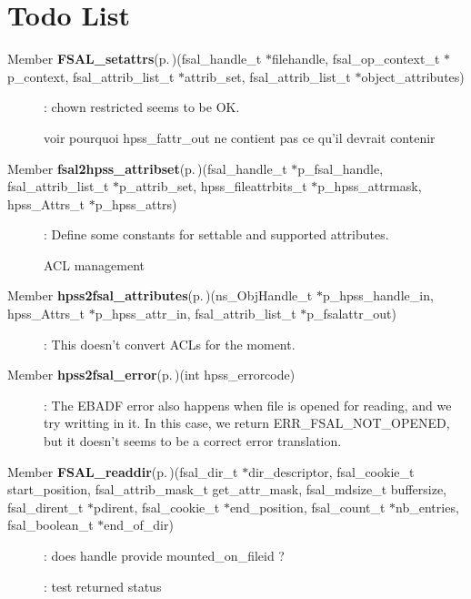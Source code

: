 \section{Todo List}\label{todo}
\label{todo__todo000001}
 \begin{description}
\item[Member {\bf FSAL\_\-setattrs}{\rm (p.\,\pageref{fsal__attrs_8c_a1})}(fsal\_\-handle\_\-t $\ast$filehandle, fsal\_\-op\_\-context\_\-t $\ast$p\_\-context, fsal\_\-attrib\_\-list\_\-t $\ast$attrib\_\-set, fsal\_\-attrib\_\-list\_\-t $\ast$object\_\-attributes) ]: chown restricted seems to be OK. 

voir pourquoi hpss\_\-fattr\_\-out ne contient pas ce qu'il devrait contenir\end{description}


\label{todo__todo000004}
 \begin{description}
\item[Member {\bf fsal2hpss\_\-attribset}{\rm (p.\,\pageref{fsal__convert_8c_a16})}(fsal\_\-handle\_\-t $\ast$p\_\-fsal\_\-handle, fsal\_\-attrib\_\-list\_\-t $\ast$p\_\-attrib\_\-set, hpss\_\-fileattrbits\_\-t $\ast$p\_\-hpss\_\-attrmask, hpss\_\-Attrs\_\-t $\ast$p\_\-hpss\_\-attrs) ]: Define some constants for settable and supported attributes. 

ACL management\end{description}


\label{todo__todo000003}
 \begin{description}
\item[Member {\bf hpss2fsal\_\-attributes}{\rm (p.\,\pageref{fsal__convert_8c_a14})}(ns\_\-Obj\-Handle\_\-t $\ast$p\_\-hpss\_\-handle\_\-in, hpss\_\-Attrs\_\-t $\ast$p\_\-hpss\_\-attr\_\-in, fsal\_\-attrib\_\-list\_\-t $\ast$p\_\-fsalattr\_\-out) ]: This doesn't convert ACLs for the moment.\end{description}


\label{todo__todo000002}
 \begin{description}
\item[Member {\bf hpss2fsal\_\-error}{\rm (p.\,\pageref{fsal__convert_8c_a2})}(int hpss\_\-errorcode) ]: The EBADF error also happens when file is opened for reading, and we try writting in it. In this case, we return ERR\_\-FSAL\_\-NOT\_\-OPENED, but it doesn't seems to be a correct error translation. \end{description}


\label{todo__todo000005}
 \begin{description}
\item[Member {\bf FSAL\_\-readdir}{\rm (p.\,\pageref{fsal__dirs_8c_a1})}(fsal\_\-dir\_\-t $\ast$dir\_\-descriptor, fsal\_\-cookie\_\-t start\_\-position, fsal\_\-attrib\_\-mask\_\-t get\_\-attr\_\-mask, fsal\_\-mdsize\_\-t buffersize, fsal\_\-dirent\_\-t $\ast$pdirent, fsal\_\-cookie\_\-t $\ast$end\_\-position, fsal\_\-count\_\-t $\ast$nb\_\-entries, fsal\_\-boolean\_\-t $\ast$end\_\-of\_\-dir) ]: does handle provide mounted\_\-on\_\-fileid ? 

: test returned status\end{description}



